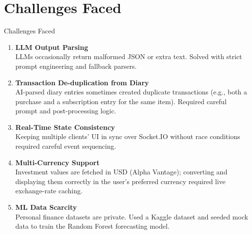 \documentclass[aspectratio=169, 11pt]{beamer}
\begin{document}
\section{Challenges Faced}
\begin{frame}{Challenges Faced}
  \begin{enumerate}
    \item[\textcolor{auraviolet}{\faExclamationTriangle}] \textbf{LLM Output Parsing} \\
          LLMs occasionally return malformed JSON or extra text. Solved with strict prompt engineering and fallback parsers.

    \vspace{5pt}
    \item[\textcolor{auraviolet}{\faExclamationTriangle}] \textbf{Transaction De-duplication from Diary} \\
          AI-parsed diary entries sometimes created duplicate transactions (e.g., both a purchase and a subscription entry for the same item). Required careful prompt and post-processing logic.

    \vspace{5pt}
    \item[\textcolor{auraviolet}{\faExclamationTriangle}] \textbf{Real-Time State Consistency} \\
          Keeping multiple clients' UI in sync over Socket.IO without race conditions required careful event sequencing.

    \vspace{5pt}
    \item[\textcolor{auraviolet}{\faExclamationTriangle}] \textbf{Multi-Currency Support} \\
          Investment values are fetched in USD (Alpha Vantage); converting and displaying them correctly in the user's preferred currency required live exchange-rate caching.

    \vspace{5pt}
    \item[\textcolor{auraviolet}{\faExclamationTriangle}] \textbf{ML Data Scarcity} \\
          Personal finance datasets are private. Used a Kaggle dataset and seeded mock data to train the Random Forest forecasting model.
  \end{enumerate}
\end{frame}
\end{document}
